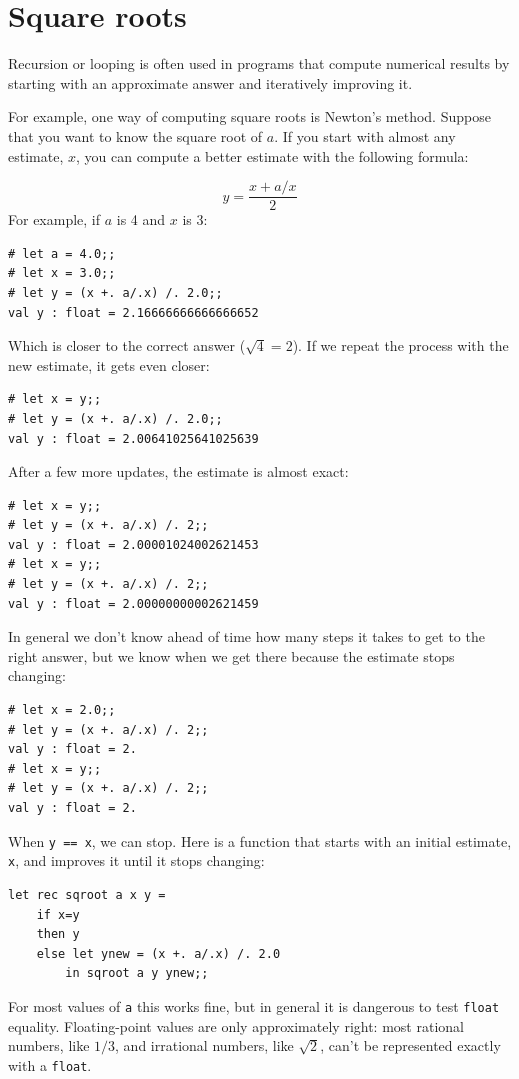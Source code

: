 \documentclass[10pt]{book}
\begin{document}
\section{Square roots}


Recursion or looping is often used in programs that compute
numerical results by starting with an approximate answer and
iteratively improving it.


For example, one way of computing square roots is Newton's method.
Suppose that you want to know the square root of $a$.  If you start
with almost any estimate, $x$, you can compute a better
estimate with the following formula:

\[ y = \frac{x + a/x}{2} \]
%
For example, if $a$ is 4 and $x$ is 3:

\beforeverb
\begin{verbatim}
# let a = 4.0;;
# let x = 3.0;;
# let y = (x +. a/.x) /. 2.0;;
val y : float = 2.16666666666666652
\end{verbatim}
\afterverb
%
Which is closer to the correct answer ($\sqrt{4} = 2$).  If we
repeat the process with the new estimate, it gets even closer:

\beforeverb
\begin{verbatim}
# let x = y;;
# let y = (x +. a/.x) /. 2.0;;
val y : float = 2.00641025641025639
\end{verbatim}
\afterverb
%
After a few more updates, the estimate is almost exact:

\beforeverb
\begin{verbatim}
# let x = y;;
# let y = (x +. a/.x) /. 2;;
val y : float = 2.00001024002621453
# let x = y;;
# let y = (x +. a/.x) /. 2;;
val y : float = 2.00000000002621459
\end{verbatim}
\afterverb
%
In general we don't know ahead of time how many steps it takes
to get to the right answer, but we know when we get there
because the estimate
stops changing:

\beforeverb
\begin{verbatim}
# let x = 2.0;;
# let y = (x +. a/.x) /. 2;;
val y : float = 2.
# let x = y;;
# let y = (x +. a/.x) /. 2;;
val y : float = 2.
\end{verbatim}
\afterverb
%
When {\tt y == x}, we can stop.  Here is a function that starts
with an initial estimate, {\tt x}, and improves it until it
stops changing:

\beforeverb
\begin{verbatim}
let rec sqroot a x y = 
	if x=y
	then y
	else let ynew = (x +. a/.x) /. 2.0
		in sqroot a y ynew;;
\end{verbatim}
\afterverb
%
For most values of {\tt a} this works fine, but in general it is
dangerous to test {\tt float} equality.
Floating-point values are only approximately right:
most rational numbers, like $1/3$, and irrational numbers, like
$\sqrt{2}$, can't be represented exactly with a {\tt float}.
\end{document}
